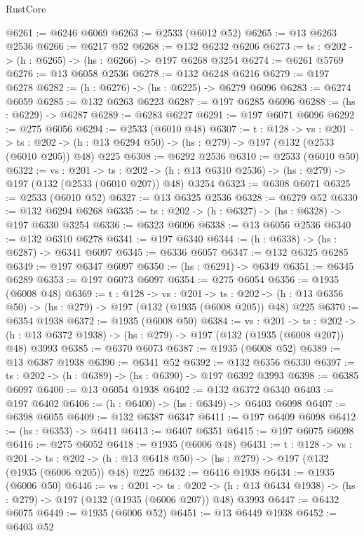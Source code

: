 \begin{lexlean}{RustCore}
\begin{coremodule}
@6261 := @6246 @6069
@6263 := @2533 (@6012 @52)
@6265 := @13 @6263 @2536
@6266 := @6217 @52
@6268 := @132 @6232 @6206
@6273 := {ts : @202} -> (h : @6265) -> (hs : @6266) -> @197 @6268 @3254
@6274 := @6261 @5769
@6276 := @13 @6058 @2536
@6278 := @132 @6248 @6216
@6279 := @197 @6278
@6282 := (h : @6276) -> (hs : @6225) -> @6279 @6096
@6283 := @6274 @6059
@6285 := @132 @6263 @6223
@6287 := @197 @6285 @6096
@6288 := (hs : @6229) -> @6287
@6289 := @6283 @6227
@6291 := @197 @6071 @6096
@6292 := @275 @6056
@6294 := @2533 (@6010 @48)
@6307 := {t : @128} ->
  {vs : @201} ->
  {ts : @202} -> (h : @13 @6294 @50) -> (hs : @279) -> @197 (@132 (@2533 (@6010 @205)) @48) @225
@6308 := @6292 @2536
@6310 := @2533 (@6010 @50)
@6322 := {vs : @201} ->
  {ts : @202} -> (h : @13 @6310 @2536) -> (hs : @279) -> @197 (@132 (@2533 (@6010 @207)) @48) @3254
@6323 := @6308 @6071
@6325 := @2533 (@6010 @52)
@6327 := @13 @6325 @2536
@6328 := @6279 @52
@6330 := @132 @6294 @6268
@6335 := {ts : @202} -> (h : @6327) -> (hs : @6328) -> @197 @6330 @3254
@6336 := @6323 @6096
@6338 := @13 @6056 @2536
@6340 := @132 @6310 @6278
@6341 := @197 @6340
@6344 := (h : @6338) -> (hs : @6287) -> @6341 @6097
@6345 := @6336 @6057
@6347 := @132 @6325 @6285
@6349 := @197 @6347 @6097
@6350 := (hs : @6291) -> @6349
@6351 := @6345 @6289
@6353 := @197 @6073 @6097
@6354 := @275 @6054
@6356 := @1935 (@6008 @48)
@6369 := {t : @128} ->
  {vs : @201} ->
  {ts : @202} -> (h : @13 @6356 @50) -> (hs : @279) -> @197 (@132 (@1935 (@6008 @205)) @48) @225
@6370 := @6354 @1938
@6372 := @1935 (@6008 @50)
@6384 := {vs : @201} ->
  {ts : @202} -> (h : @13 @6372 @1938) -> (hs : @279) -> @197 (@132 (@1935 (@6008 @207)) @48) @3993
@6385 := @6370 @6073
@6387 := @1935 (@6008 @52)
@6389 := @13 @6387 @1938
@6390 := @6341 @52
@6392 := @132 @6356 @6330
@6397 := {ts : @202} -> (h : @6389) -> (hs : @6390) -> @197 @6392 @3993
@6398 := @6385 @6097
@6400 := @13 @6054 @1938
@6402 := @132 @6372 @6340
@6403 := @197 @6402
@6406 := (h : @6400) -> (hs : @6349) -> @6403 @6098
@6407 := @6398 @6055
@6409 := @132 @6387 @6347
@6411 := @197 @6409 @6098
@6412 := (hs : @6353) -> @6411
@6413 := @6407 @6351
@6415 := @197 @6075 @6098
@6416 := @275 @6052
@6418 := @1935 (@6006 @48)
@6431 := {t : @128} ->
  {vs : @201} ->
  {ts : @202} -> (h : @13 @6418 @50) -> (hs : @279) -> @197 (@132 (@1935 (@6006 @205)) @48) @225
@6432 := @6416 @1938
@6434 := @1935 (@6006 @50)
@6446 := {vs : @201} ->
  {ts : @202} -> (h : @13 @6434 @1938) -> (hs : @279) -> @197 (@132 (@1935 (@6006 @207)) @48) @3993
@6447 := @6432 @6075
@6449 := @1935 (@6006 @52)
@6451 := @13 @6449 @1938
@6452 := @6403 @52

\end{coremodule}
\end{lexlean}
